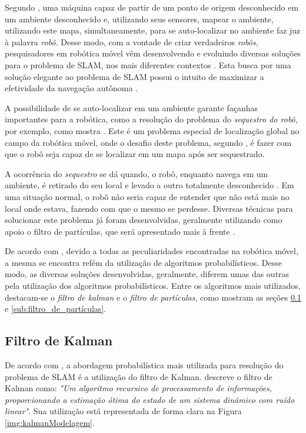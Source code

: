 Segundo \cite{slamProblem}, uma máquina capaz de partir de um ponto de origem desconhecido em um ambiente desconhecido e, utilizando seus sensores, mapear o ambiente, utilizando este mapa, simultaneamente, para se auto-localizar no ambiente faz juz à palavra \textit{robô}. Desse modo, com a vontade de criar verdadeiros \textit{robôs}, pesquisadores em robótica móvel vêm desenvolvendo e evoluindo diversas soluções para o problema de SLAM, nos mais diferentes contextos \cite{integrationVisionSLAMnonlinear}. Esta busca por uma solução elegante ao problema de SLAM possui o intuito de maximizar a efetividade da navegação autônoma \cite{theCleaningProject}.

A possibilidade de se auto-localizar em um ambiente garante façanhas importantes para a robótica, como a resolução do problema do \textit{sequestro do robô}, por exemplo, como mostra \cite{sequestro}. Este é um problema especial de localização global no campo da robótica móvel, onde o desafio deste problema, segundo \cite{sequestroRobo}, é fazer com que o robô seja capaz de se localizar em um mapa após ser sequestrado.

A ocorrência do \textit{sequestro} se dá quando, o robô, enquanto navega em um ambiente, é retirado do seu local e levado a outro totalmente desconhecido \cite{sequestro}. Em uma situação normal, o robô não seria capaz de entender que não está mais no local onde estava, fazendo com que o mesmo se perdesse. Diversas técnicas para solucionar este problema já foram desenvolvidas, geralmente utilizando como apoio o filtro de partículas, que será apresentado mais à frente \cite{sequestroRobo}.

De acordo com \cite{circumventingAssociationSLAM}, devido a todas as peculiaridades encontradas na robótica móvel, a mesma se encontra refém da utilização de algoritmos probabilísticos. Desse modo, as diversas soluções desenvolvidas, geralmente, diferem umas das outras pela utilização dos algoritmos probabilísticos. Entre os algoritmos mais utilizados, destacam-se o \textit{filtro de kalman} e o \textit{filtro de partículas}, como mostram as seções \ref{sub:kalman} e \ref{sub:filtro_de_partículas}.

\subsection{Filtro de Kalman} %
\label{sub:kalman}

De acordo com \cite{slamProblem}, a abordagem probabilística mais utilizada para resolução do problema de SLAM é a utilização do filtro de Kalman. \cite{theCleaningProject} descreve o filtro de Kalman como: \textit{"Um algoritmo recursivo de processamento de informações, proporcionando a estimação ótima do estado de um sistema dinâmico com ruído linear"}. Sua utilização está representada de forma clara na Figura \ref{img:kalmanModelagem}.

